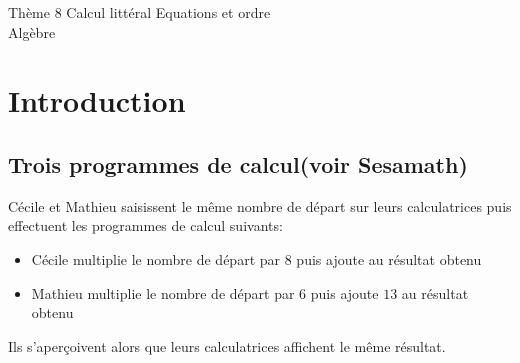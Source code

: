 \documentclass[10pt]{article}
\begin{document}
\begin{encadrementombre}{Thème 8 Calcul littéral}
{\LARGE Equations et ordre }\\

{\Large Algèbre}
\end{encadrementombre}



{\setlength{\baselineskip}{1.5\baselineskip}

\section{Introduction}
\subsection{Trois programmes de calcul(voir Sesamath)}
\begin{shaded}
Cécile et Mathieu saisissent le même nombre de départ sur leurs calculatrices puis effectuent les programmes de calcul suivants:
\begin{itemize}
\item Cécile multiplie le nombre de départ par $8$ puis ajoute au résultat obtenu
\item Mathieu multiplie le nombre de départ par $6$ puis ajoute $13$ au résultat obtenu 
\end{itemize}
Ils s'aperçoivent alors que leurs calculatrices affichent le même résultat.\\
\end{shaded}

}
\end{document}
